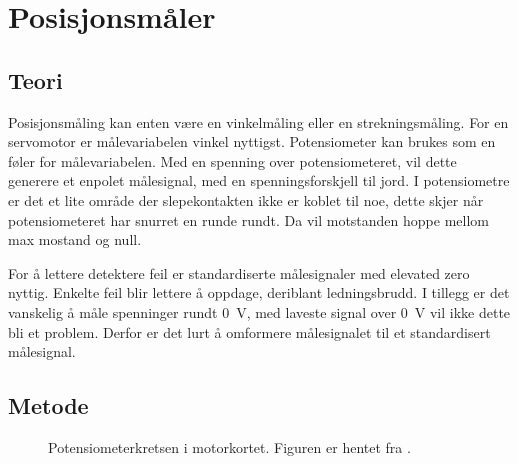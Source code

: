 \section{Posisjonsmåler}
\label{sec:pos_måler}

\subsection{Teori}




Posisjonsmåling kan enten være en vinkelmåling eller en strekningsmåling. For en servomotor er målevariabelen vinkel nyttigst. Potensiometer kan brukes som en føler for målevariabelen. Med en spenning over potensiometeret, vil dette generere et enpolet målesignal, med en spenningsforskjell til jord. I potensiometre er det et lite område der slepekontakten ikke er koblet til noe, dette skjer når potensiometeret har snurret en runde rundt.
Da vil motstanden hoppe mellom max mostand og null.

For å lettere detektere feil er standardiserte målesignaler med elevated zero nyttig. Enkelte feil blir lettere å oppdage, deriblant ledningsbrudd. I tillegg er det vanskelig å måle spenninger rundt \SI{0}{\volt}, med laveste signal over \SI{0}{\volt} vil ikke dette bli et problem. Derfor er det lurt å omformere målesignalet til et standardisert målesignal.






\subsection{Metode}

\begin{figure}[h]
    \centering
    
    \caption{Potensiometerkretsen i motorkortet. Figuren er hentet fra \cite{AnalogMotorlabbOppgaver}.}
    \label{fig:posisjon_maler_potmeter}
\end{figure}


